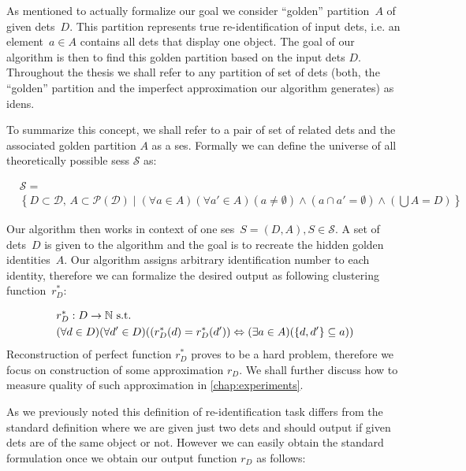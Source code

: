 As mentioned to actually formalize our goal we consider ``golden'' 
partition~$A$ of given \glspl{det}~$D$. This partition represents true
re-identification of input \glspl{det}, i.e. an element~$a \in A$ contains
all \glspl{det} that display one object. The goal of our algorithm is then
to find this golden partition based on the input \glspl{det} $D$. Throughout
the thesis we shall refer to any partition of set of \glspl{det} (both, the
``golden'' partition and the imperfect approximation our algorithm generates) as
\glspl{iden}.

To summarize this concept, we shall refer to a pair of set of related 
\glspl{det} and the associated golden partition $A$ as a \gls{ses}. Formally
we can define the universe of all theoretically possible \glspl{ses}
$\mathcal{S}$ as:

\begin{equation*}
\begin{split}
&\mathcal{S} =\\& \left\{D \subset \mathcal{D},\,A \subset \mathcal{P(D)} \mid (\forall a \in A) (\forall a' \in A) (a \neq \emptyset) \land (a \cap a' = \emptyset) \land \left(\bigcup A = D\right)\right\}    
\end{split}
\end{equation*}


Our algorithm then works in context of one
\gls{ses}~$S = (D, A), S \in \mathcal{S}$. A set of \glspl{det}~$D$ is given to 
the  algorithm and the goal is to recreate the hidden golden identities~$A$.
Our algorithm assigns arbitrary identification number to each identity,
therefore we can formalize the desired output as following clustering
function~$r_D^*$:

\begin{equation}
\begin{split}
&r_D^*: D \rightarrow \mathbb{N} \text{ s.t. }\\
&(\forall d \in D) (\forall d' \in D) ((r_D^*(d) = r_D^*(d')) \Leftrightarrow (\exists a \in A) (\{d, d'\} \subseteq a))
\label{eq:reidentification}
\end{split}
\end{equation}
Reconstruction of perfect function $r_D^*$ proves to be a hard problem, 
therefore we focus on construction of some approximation $r_D$. We shall further discuss how to measure quality of such approximation in
\autoref{chap:experiments}.

As we previously noted this definition of re-identification task differs from
the standard definition where we are given just two \glspl{det} and should
output if given \glspl{det} are of the same object or not. However we can easily
obtain the standard formulation once we obtain our output function $r_D$ as
follows:

